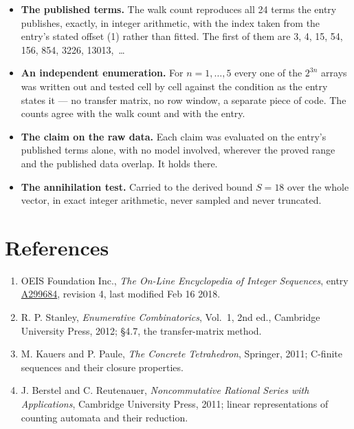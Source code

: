 \documentclass[11pt]{article}
\theoremstyle{definition}
\begin{document}
\begin{itemize}

\item {\bfseries The published terms.} The walk count reproduces all 24 terms the entry publishes, exactly, in integer arithmetic, with the index taken from the entry's stated offset (1) rather than fitted. The first of them are 3, 4, 15, 54, 156, 854, 3226, 13013,~\dots

\item {\bfseries An independent enumeration.} For $n = 1,\dots,5$ every one of the $2^{3n}$ arrays was written out and tested cell by cell against the condition as the entry states it --- no transfer matrix, no row window, a separate piece of code. The counts agree with the walk count and with the entry.

\item {\bfseries The claim on the raw data.} Each claim was evaluated on the entry's published terms alone, with no model involved, wherever the proved range and the published data overlap. It holds there.

\item {\bfseries The annihilation test.} Carried to the derived bound $S = 18$ over the whole vector, in exact integer arithmetic, never sampled and never truncated.

\end{itemize}

\section{References}

\begin{enumerate}

\item OEIS Foundation Inc., \emph{The On-Line Encyclopedia of Integer Sequences}, entry \href{https://oeis.org/A299684}{A299684}, revision 4, last modified Feb 16 2018.

\item R. P. Stanley, \emph{Enumerative Combinatorics}, Vol.~1, 2nd ed., Cambridge University Press, 2012; \S4.7, the transfer-matrix method.

\item M. Kauers and P. Paule, \emph{The Concrete Tetrahedron}, Springer, 2011; C-finite sequences and their closure properties.

\item J. Berstel and C. Reutenauer, \emph{Noncommutative Rational Series with Applications}, Cambridge University Press, 2011; linear representations of counting automata and their reduction.

\end{enumerate}
\end{document}
